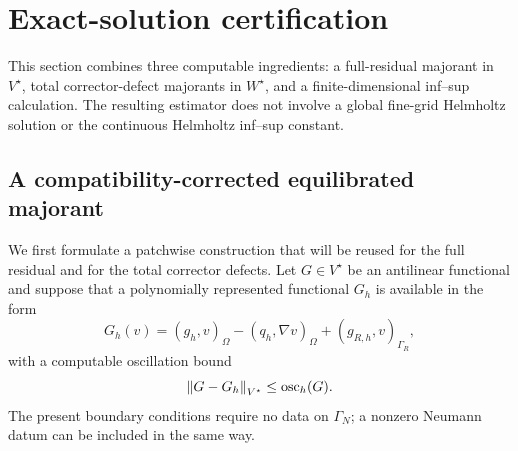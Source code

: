 \section{Exact-solution certification}
\label{sec:exact-certification}

This section combines three computable ingredients: a full-residual
majorant in $V^\star$, total corrector-defect majorants in $W^\star$, and
a finite-dimensional inf--sup calculation.  The resulting estimator does
not involve a global fine-grid Helmholtz solution or the continuous
Helmholtz inf--sup constant.

\subsection{A compatibility-corrected equilibrated majorant}
\label{sec:generic-equilibrated}

We first formulate a patchwise construction that will be reused for the
full residual and for the total corrector defects.  Let $G\in V^\star$ be
an antilinear functional and suppose that a polynomially represented
functional $G_h$ is available in the form
\begin{equation}
\label{eq:generic-functional-data}
  G_h(v)
  =(g_h,v)_\Omega-(q_h,\nabla v)_\Omega
   +(g_{R,h},v)_{\Gamma_R},
\end{equation}
with a computable oscillation bound
\begin{equation}
\label{eq:generic-oscillation}
  \left\lVert G-G_h\right\rVert_{V^\star}\leq\operatorname{osc}_h(G).
\end{equation}
The present boundary conditions require no data on $\Gamma_N$; a
nonzero Neumann datum can be included in the same way.


